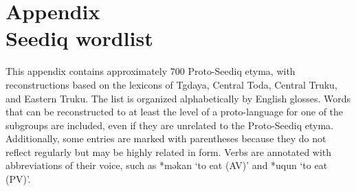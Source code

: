 \newpage
{}

\appendix
\setcounter{chapter}{0}
\setcounter{secnumdepth}{0}
\pagestyle{appendixstyle}
\chapter*{Appendix\\Seediq wordlist} \label{wordlist}

This appendix contains approximately 700 Proto-Seediq etyma, with reconstructions based on the lexicons of Tgdaya, Central Toda, Central Truku, and Eastern Truku. The list is organized alphabetically by English glosses. Words that can be reconstructed to at least the level of a proto-language for one of the subgroups are included, even if they are unrelated to the Proto-Seediq etyma. Additionally, some entries are marked with parentheses because they do not reflect regularly but may be highly related in form. Verbs are annotated with abbreviations of their voice, such as *məkan `to eat (AV)' and *uqun `to eat (PV)'.

